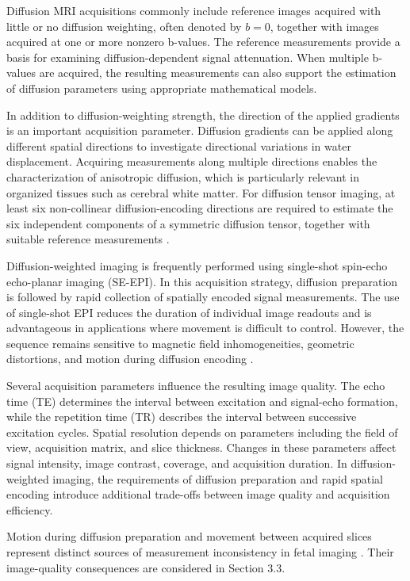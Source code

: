 Diffusion MRI acquisitions commonly include reference images acquired with little or no diffusion weighting, often denoted by $b=0$, together with images acquired at one or more nonzero b-values. The reference measurements provide a basis for examining diffusion-dependent signal attenuation. When multiple b-values are acquired, the resulting measurements can also support the estimation of diffusion parameters using appropriate mathematical models.

In addition to diffusion-weighting strength, the direction of the applied gradients is an important acquisition parameter. Diffusion gradients can be applied along different spatial directions to investigate directional variations in water displacement. Acquiring measurements along multiple directions enables the characterization of anisotropic diffusion, which is particularly relevant in organized tissues such as cerebral white matter. For diffusion tensor imaging, at least six non-collinear diffusion-encoding directions are required to estimate the six independent components of a symmetric diffusion tensor, together with suitable reference measurements \autocite{basser1994tensor}.

Diffusion-weighted imaging is frequently performed using single-shot spin-echo echo-planar imaging (SE-EPI). In this acquisition strategy, diffusion preparation is followed by rapid collection of spatially encoded signal measurements. The use of single-shot EPI reduces the duration of individual image readouts and is advantageous in applications where movement is difficult to control. However, the sequence remains sensitive to magnetic field inhomogeneities, geometric distortions, and motion during diffusion encoding \autocite{snoussi2025haitch,avilesverdera2025heron}.

Several acquisition parameters influence the resulting image quality. The echo time (TE) determines the interval between excitation and signal-echo formation, while the repetition time (TR) describes the interval between successive excitation cycles. Spatial resolution depends on parameters including the field of view, acquisition matrix, and slice thickness. Changes in these parameters affect signal intensity, image contrast, coverage, and acquisition duration. In diffusion-weighted imaging, the requirements of diffusion preparation and rapid spatial encoding introduce additional trade-offs between image quality and acquisition efficiency.

Motion during diffusion preparation and movement between acquired slices represent distinct sources of measurement inconsistency in fetal imaging \autocite{malamateniou2013motion,snoussi2025haitch}. Their image-quality consequences are considered in Section 3.3.

